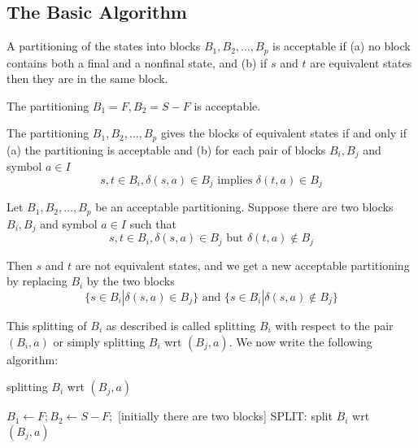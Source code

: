 \subsection{The Basic Algorithm}
\begin{definition}
	A partitioning of the states into blocks $B_1,B_2,\dots,B_p$ is acceptable if (a) no block contains both a final and a nonfinal state, and (b) if $s$ and $t$ are equivalent states then they are in the same block.
\end{definition}

\begin{lemma} \label{lem:partitioning}
	The partitioning $B_1=F,B_2=S-F$ is acceptable.
\end{lemma}

\begin{lemma} \label{lem:stSame}
	The partitioning $B_1,B_2,\dots,B_p$ gives the blocks of equivalent states if and only if (a) the partitioning is acceptable and (b) for each pair of blocks $B_i,B_j$ and symbol $a\in I$
	\begin{equation}
	s,t\in B_i,\delta(s,a)\in B_j \text{ implies } \delta(t,a)\in B_j
	\end{equation}
\end{lemma}

\begin{lemma} \label{lem:split}
	Let $B_1,B_2,\dots,B_p$ be an acceptable partitioning. Suppose there are two blocks $B_i,B_j$ and symbol $a\in I$ such that
	\begin{equation}
	s,t\in B_i,\delta(s,a)\in B_j \text{ but } \delta(t,a)\notin B_j
	\label{eq:split}
	\end{equation}
	
	Then $s$ and $t$ are not equivalent states, and we get a new acceptable partitioning by replacing $B_i$ by the two blocks
	\begin{equation}
	\{s\in B_i|\delta(s,a)\in B_j\} \text{ and } \{s\in B_i|\delta(s,a)\notin B_j\}
	\end{equation}
\end{lemma}

This splitting of $B_i$ as described is called splitting $B_i$ with respect to the pair $(B_i, a)$ or simply splitting $B_i$ wrt $(B_j, a)$. We now write the following algorithm:

\begin{algorithm}  
	\caption{splitting $B_i$ wrt $(B_j, a)$} 
	\label{alg:splitting} 
	\begin{algorithmic}%
	\State $B_1 \gets F; B_2\gets S-F;$  [initially there are two blocks]  
		\State SPLIT: split $B_i$ wrt $(B_j,a)$
	\EndWhile
	\end{algorithmic}   
\end{algorithm}

